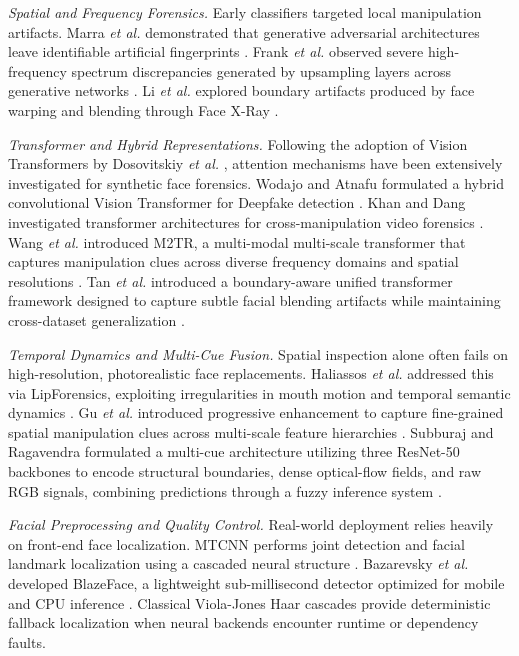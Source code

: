 \documentclass[conference]{IEEEtran}
\begin{document}
\textit{Spatial and Frequency Forensics.} Early classifiers targeted local manipulation artifacts. Marra \textit{et al.} demonstrated that generative adversarial architectures leave identifiable artificial fingerprints \cite{marra2019}. Frank \textit{et al.} observed severe high-frequency spectrum discrepancies generated by upsampling layers across generative networks \cite{frank2020}. Li \textit{et al.} explored boundary artifacts produced by face warping and blending through Face X-Ray \cite{li2021boundary}.

\textit{Transformer and Hybrid Representations.} Following the adoption of Vision Transformers by Dosovitskiy \textit{et al.} \cite{dosovitskiy2021}, attention mechanisms have been extensively investigated for synthetic face forensics. Wodajo and Atnafu formulated a hybrid convolutional Vision Transformer for Deepfake detection \cite{wodajo2021}. Khan and Dang investigated transformer architectures for cross-manipulation video forensics \cite{khan2022}. Wang \textit{et al.} introduced M2TR, a multi-modal multi-scale transformer that captures manipulation clues across diverse frequency domains and spatial resolutions \cite{wang2023}. Tan \textit{et al.} introduced a boundary-aware unified transformer framework designed to capture subtle facial blending artifacts while maintaining cross-dataset generalization \cite{tan2024}.

\textit{Temporal Dynamics and Multi-Cue Fusion.} Spatial inspection alone often fails on high-resolution, photorealistic face replacements. Haliassos \textit{et al.} addressed this via LipForensics, exploiting irregularities in mouth motion and temporal semantic dynamics \cite{haliassos2021}. Gu \textit{et al.} introduced progressive enhancement to capture fine-grained spatial manipulation clues across multi-scale feature hierarchies \cite{gu2022}. Subburaj and Ragavendra formulated a multi-cue architecture utilizing three ResNet-50 backbones to encode structural boundaries, dense optical-flow fields, and raw RGB signals, combining predictions through a fuzzy inference system \cite{subburaj2025}.

\textit{Facial Preprocessing and Quality Control.} Real-world deployment relies heavily on front-end face localization. MTCNN performs joint detection and facial landmark localization using a cascaded neural structure \cite{zhang2016}. Bazarevsky \textit{et al.} developed BlazeFace, a lightweight sub-millisecond detector optimized for mobile and CPU inference \cite{bazarevsky2019}. Classical Viola-Jones Haar cascades \cite{viola2001} provide deterministic fallback localization when neural backends encounter runtime or dependency faults.
\end{document}
